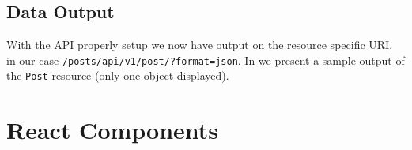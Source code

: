 \subsection{Data Output}
\label{sub-sec:output}

With the API properly setup we now have output on the resource specific URI, in our case \texttt{/posts/api/v1/post/?format=json}. In  we present a sample output of the \texttt{Post} resource (only one object displayed).

	



\section{React Components}
\label{sec:react0components}

